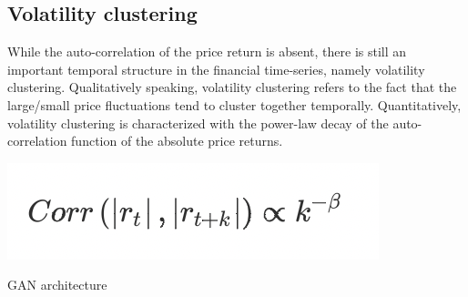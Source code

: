 \documentclass{article}
\begin{document}
\begin{multicols}{2}
    \subsection*{Volatility clustering}
    While the auto-correlation of the price return is absent, there is still an important temporal structure in the financial time-series, namely volatility clustering. Qualitatively speaking, volatility clustering refers to the fact that the large/small price fluctuations tend to cluster together temporally. Quantitatively, volatility clustering is characterized with the power-law decay of the auto-correlation function of the absolute price returns. 
    \begin{center}
        \includegraphics[scale = 0.8]{imgs/elisa/cl.jpg} 
    \end{center}

\end{multicols}

\begin{center}
    {\huge{GAN architecture}}
\end{center}  
\end{document}
